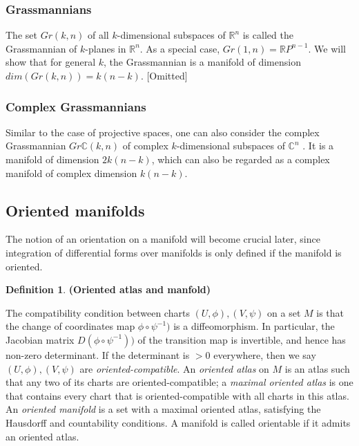 \documentclass{article}
\theoremstyle{definition}
\newtheorem{defn}[theorem]{Definition}
\newenvironment{definition}
  {\vspace{8pt}\begin{mdframed}[backgroundcolor=blueish]\begin{defn}}
  {\end{defn}\end{mdframed}\vspace{4pt}}
\begin{document}
\subsubsection{Grassmannians}
The set $Gr(k,n)$ of all $k$-dimensional subspaces of $\mathbb R^n$ is called the Grassmannian of $k$-planes in $\mathbb R^n$. As a special case, $Gr(1,n) = \mathbb RP^{n-1}$. We will show that for general $k$, the Grassmannian is a manifold of dimension $dim(Gr(k,n)) = k(n-k)$. [Omitted]

\subsubsection{Complex Grassmannians}

Similar to the case of projective spaces, one can also consider the complex Grassmannian $Gr \mathbb C(k,n)$ of complex $k$-dimensional subspaces of $\mathbb C^n$ . It is a manifold of dimension $2k(n-k)$, which can also be regarded as a complex manifold of complex dimension $k(n-k)$.

\subsection{Oriented manifolds}

The notion of an orientation on a manifold will become crucial later, since integration of differential forms over manifolds is only defined if the manifold is oriented.

\begin{definition} \textbf{(Oriented atlas and manfold)}

The compatibility condition between charts $(U,\phi),(V,\psi)$ on a set $M$ is that the change of coordinates map $\phi \circ \psi^{-1})$ is a diffeomorphism. In particular, the Jacobian matrix $D(\phi \circ \psi^{-1}))$ of the transition map is invertible, and hence has non-zero determinant.  If the determinant is $> 0$  everywhere, then we say $(U,\phi),(V,\psi)$ are \textit{oriented-compatible}.  An \textit{oriented atlas} on $M$ is an atlas such that any two of its charts are oriented-compatible; a \textit{maximal oriented atlas} is one that contains every chart that is oriented-compatible with all charts in this atlas. An \textit{oriented manifold} is a set with a maximal oriented atlas, satisfying the Hausdorff and countability conditions. A manifold is called orientable if it admits an oriented atlas.

\end{definition}
\end{document}
